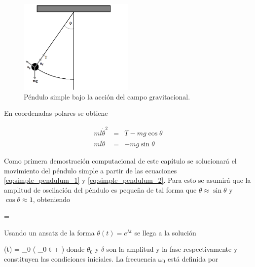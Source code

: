 \newpage
\begin{figure}[htbp]
	\centering
	\includegraphics[width=0.50\textwidth]
	{./pictures/simple_pendulum.png}

	\caption{\small{Péndulo simple bajo la acción del campo gravitacional.}}
	
	\label{fig:simple_pendulum}
\end{figure}


En coordenadas polares se obtiene


\begin{eqnarray}
\label{eq:simple_pendulum_1}
ml\dot \theta^2 &=& T - mg \cos \theta \\
\label{eq:simple_pendulum_2}
ml\ddot \theta &=& -mg \sin \theta
\end{eqnarray}


Como primera demostración computacional de este capítulo se solucionará el 
movimiento del péndulo simple a partir de las ecuaciones 
\ref{eq:simple_pendulum_1} y \ref{eq:simple_pendulum_2}. Para esto se 
asumirá que la amplitud de oscilación del péndulo es pequeña de tal forma 
que $\theta \approx \sin \theta$ y $\cos \theta \approx 1$, obteniendo


{\ddot \theta = -  \theta}


Usando un ansatz de la forma $\theta(t) = e^{\lambda t}$ se llega a la
solución


{ \theta(t) = \theta_0 \sin ( \omega_0 t + \delta ) }
donde $\theta_0$ y $\delta$ son la amplitud y la fase respectivamente y 
constituyen las condiciones iniciales. La frecuencia $\omega_0$ está 
definida por 



